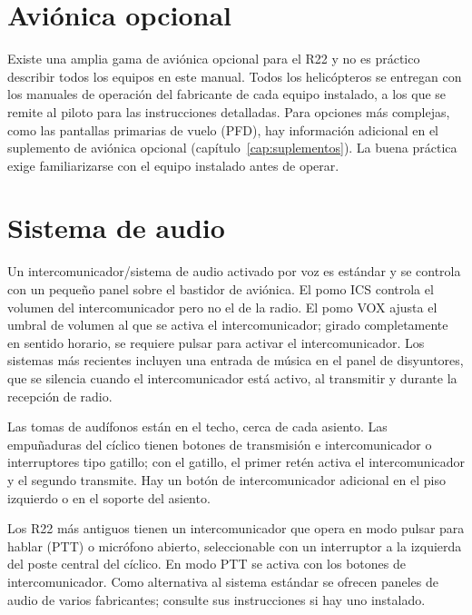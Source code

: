 
\section{Aviónica opcional}

Existe una amplia gama de aviónica opcional para el R22 y no es práctico describir todos los equipos en este manual. Todos los helicópteros se entregan con los manuales de operación del fabricante de cada equipo instalado, a los que se remite al piloto para las instrucciones detalladas. Para opciones más complejas, como las pantallas primarias de vuelo (PFD), hay información adicional en el suplemento de aviónica opcional (capítulo~\ref{cap:suplementos}). La buena práctica exige familiarizarse con el equipo instalado antes de operar.

\section{Sistema de audio}

Un intercomunicador/sistema de audio activado por voz es estándar y se controla con un pequeño panel sobre el bastidor de aviónica. El pomo \textsf{ICS} controla el volumen del intercomunicador pero no el de la radio. El pomo \textsf{VOX} ajusta el umbral de volumen al que se activa el intercomunicador; girado completamente en sentido horario, se requiere pulsar para activar el intercomunicador. Los sistemas más recientes incluyen una entrada de música en el panel de disyuntores, que se silencia cuando el intercomunicador está activo, al transmitir y durante la recepción de radio.

Las tomas de audífonos están en el techo, cerca de cada asiento. Las empuñaduras del cíclico tienen botones de transmisión e intercomunicador o interruptores tipo gatillo; con el gatillo, el primer retén activa el intercomunicador y el segundo transmite. Hay un botón de intercomunicador adicional en el piso izquierdo o en el soporte del asiento.

Los R22 más antiguos tienen un intercomunicador que opera en modo pulsar para hablar (PTT) o micrófono abierto, seleccionable con un interruptor a la izquierda del poste central del cíclico. En modo PTT se activa con los botones de intercomunicador. Como alternativa al sistema estándar se ofrecen paneles de audio de varios fabricantes; consulte sus instrucciones si hay uno instalado.

